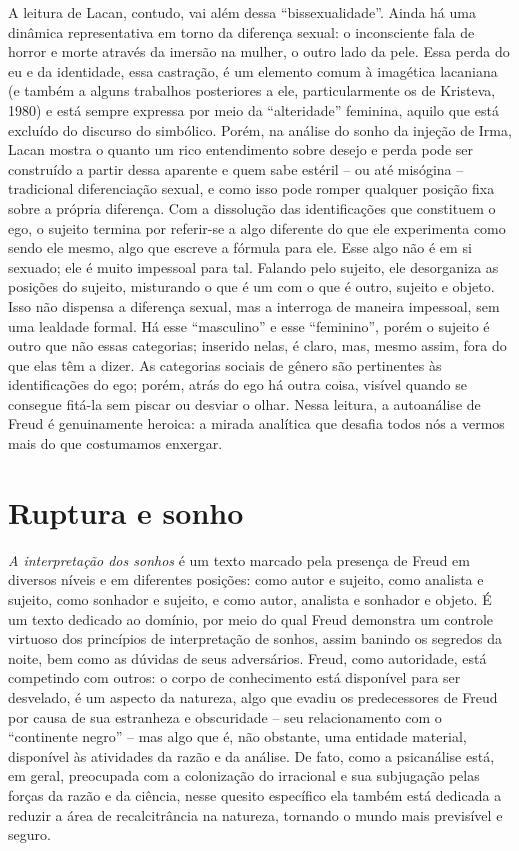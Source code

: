 A leitura de Lacan, contudo, vai além dessa ``bissexualidade''. Ainda há
uma dinâmica representativa em torno da diferença sexual: o inconsciente
fala de horror e morte através da imersão na mulher, o outro lado da
pele. Essa perda do eu e da identidade, essa castração, é um elemento
comum à imagética lacaniana (e também a alguns trabalhos posteriores a
ele, particularmente os de Kristeva, 1980) e está sempre expressa por
meio da ``alteridade'' feminina, aquilo que está excluído do discurso do
simbólico. Porém, na análise do sonho da injeção de Irma, Lacan mostra o
quanto um rico entendimento sobre desejo e perda pode ser construído a
partir dessa aparente e quem sabe estéril -- ou até misógina --
tradicional diferenciação sexual, e como isso pode romper qualquer
posição fixa sobre a própria diferença. Com a dissolução das
identificações que constituem o ego, o sujeito termina por referir-se a
algo diferente do que ele experimenta como sendo ele mesmo, algo que
escreve a fórmula para ele. Esse algo não é em si sexuado; ele é muito
impessoal para tal. Falando pelo sujeito, ele desorganiza as posições do
sujeito, misturando o que é um com o que é outro, sujeito e objeto. Isso
não dispensa a diferença sexual, mas a interroga de maneira impessoal,
sem uma lealdade formal. Há esse ``masculino'' e esse ``feminino'',
porém o sujeito é outro que não essas categorias; inserido nelas, é
claro, mas, mesmo assim, fora do que elas têm a dizer. As categorias
sociais de gênero são pertinentes às identificações do ego; porém, atrás
do ego há outra coisa, visível quando se consegue fitá-la sem piscar ou
desviar o olhar. Nessa leitura, a autoanálise de Freud é genuinamente
heroica: a mirada analítica que desafia todos nós a vermos mais do que
costumamos enxergar.

\section{Ruptura e sonho}

\emph{A interpretação dos sonhos} é um texto marcado pela presença de
Freud em diversos níveis e em diferentes posições: como autor e sujeito,
como analista e sujeito, como sonhador e sujeito, e como autor, analista
e sonhador e objeto. É um texto dedicado ao domínio, por meio do qual
Freud demonstra um controle virtuoso dos princípios de interpretação de
sonhos, assim banindo os segredos da noite, bem como as dúvidas de seus
adversários. Freud, como autoridade, está competindo com outros: o corpo
de conhecimento está disponível para ser desvelado, é um aspecto da
natureza, algo que evadiu os predecessores de Freud por causa de sua
estranheza e obscuridade -- seu relacionamento com o ``continente
negro'' -- mas algo que é, não obstante, uma entidade material,
disponível às atividades da razão e da análise. De fato, como a
psicanálise está, em geral, preocupada com a colonização do irracional e
sua subjugação pelas forças da razão e da ciência, nesse quesito
específico ela também está dedicada a reduzir a área de recalcitrância
na natureza, tornando o mundo mais previsível e seguro.

